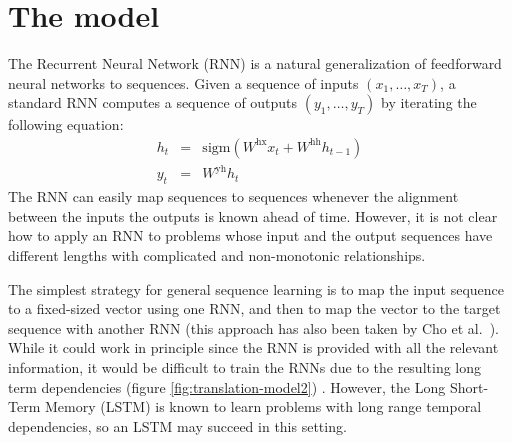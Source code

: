 
\section{The model}
\label{sec:model}

The Recurrent Neural Network (RNN) \cite{werbos,rumelhart1986learning}
is a natural generalization of feedforward neural networks to
sequences.  Given a sequence of inputs $(x_1,\ldots,x_T)$, a
standard RNN computes a sequence of outputs $(y_1,\ldots,y_T)$ by
iterating the following equation: 
\begin{eqnarray*}
h_t &=& \mathrm{sigm}\left(W^{\mathrm{hx}} x_t + W^{\mathrm{hh}} h_{t-1}\right) \\
y_t &=& W^{\mathrm{yh}}h_t
\end{eqnarray*}
The RNN can easily map sequences to sequences whenever the alignment
between the inputs the outputs is known ahead of time. However, it is
not clear how to apply an RNN to problems whose input and the output
sequences have different lengths with complicated and non-monotonic
relationships.

The simplest strategy for general sequence learning is to map the input
sequence to a fixed-sized vector using one RNN, and then to map the
vector to the target sequence with another RNN (this approach has also been
taken by Cho et al.~\cite{cho14}).  While it could work
in principle since the RNN is provided with all the relevant
information, it would be difficult to train the RNNs due to the
resulting long term dependencies
(figure \ref{fig:translation-model2})
\cite{hochreiter_long_term,bengio_long_term,hochreiter97,Hochreiter01gradientflow}. However, the Long
Short-Term Memory (LSTM) \cite{hochreiter97} is known to learn
problems with long range temporal dependencies, so an LSTM may succeed
in this setting.

